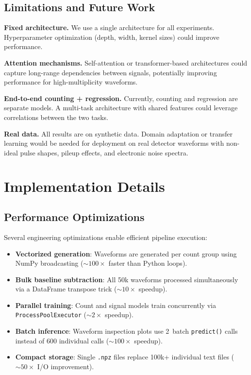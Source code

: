 \documentclass[11pt,twocolumn]{article}
\begin{document}
\subsection{Limitations and Future Work}

\textbf{Fixed architecture.}
We use a single architecture for all experiments.
Hyperparameter optimization (depth, width, kernel sizes) could improve performance.

\textbf{Attention mechanisms.}
Self-attention or transformer-based architectures could capture long-range dependencies between signals, potentially improving performance for high-multiplicity waveforms.

\textbf{End-to-end counting + regression.}
Currently, counting and regression are separate models.
A multi-task architecture with shared features could leverage correlations between the two tasks.

\textbf{Real data.}
All results are on synthetic data.
Domain adaptation or transfer learning would be needed for deployment on real detector waveforms with non-ideal pulse shapes, pileup effects, and electronic noise spectra.

\section{Implementation Details}
\label{sec:implementation}

\subsection{Performance Optimizations}

Several engineering optimizations enable efficient pipeline execution:
\begin{itemize}
    \item \textbf{Vectorized generation}: Waveforms are generated per count group using NumPy broadcasting (${\sim}100\times$ faster than Python loops).
    \item \textbf{Bulk baseline subtraction}: All 50k waveforms processed simultaneously via a DataFrame transpose trick (${\sim}10\times$ speedup).
    \item \textbf{Parallel training}: Count and signal models train concurrently via \texttt{ProcessPoolExecutor} (${\sim}2\times$ speedup).
    \item \textbf{Batch inference}: Waveform inspection plots use 2~batch \texttt{predict()} calls instead of 600 individual calls (${\sim}100\times$ speedup).
    \item \textbf{Compact storage}: Single \texttt{.npz} files replace 100k+ individual text files (${\sim}50\times$ I/O improvement).
\end{itemize}
\end{document}
